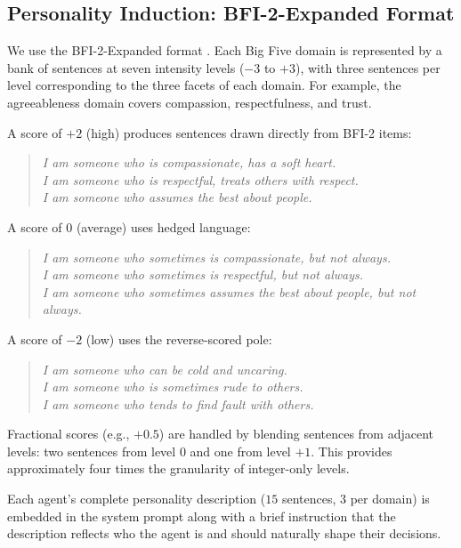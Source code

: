 \documentclass[12pt, a4paper]{article}
\begin{document}
\subsection{Personality Induction: BFI-2-Expanded Format}

We use the BFI-2-Expanded format \citep{soto2017bfi2}. Each Big Five domain is represented by a bank of sentences at seven intensity levels ($-3$ to $+3$), with three sentences per level corresponding to the three facets of each domain. For example, the agreeableness domain covers compassion, respectfulness, and trust.

A score of $+2$ (high) produces sentences drawn directly from BFI-2 items:

\begin{quote}
\emph{I am someone who is compassionate, has a soft heart.} \\
\emph{I am someone who is respectful, treats others with respect.} \\
\emph{I am someone who assumes the best about people.}
\end{quote}

A score of $0$ (average) uses hedged language:

\begin{quote}
\emph{I am someone who sometimes is compassionate, but not always.} \\
\emph{I am someone who sometimes is respectful, but not always.} \\
\emph{I am someone who sometimes assumes the best about people, but not always.}
\end{quote}

A score of $-2$ (low) uses the reverse-scored pole:

\begin{quote}
\emph{I am someone who can be cold and uncaring.} \\
\emph{I am someone who is sometimes rude to others.} \\
\emph{I am someone who tends to find fault with others.}
\end{quote}

Fractional scores (e.g., $+0.5$) are handled by blending sentences from adjacent levels: two sentences from level $0$ and one from level $+1$. This provides approximately four times the granularity of integer-only levels.

Each agent's complete personality description ($15$ sentences, $3$ per domain) is embedded in the system prompt along with a brief instruction that the description reflects who the agent is and should naturally shape their decisions.
\end{document}
